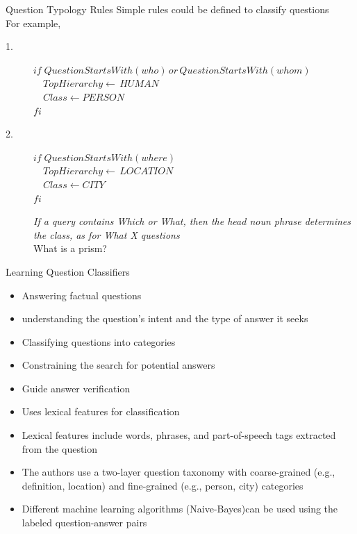 \begin{frame}{Question Typology Rules}
Simple rules could be defined to classify questions\\
For example, \\
\begin{description}
	\item[1.] $if \;QuestionStartsWith(who) \,or\, QuestionStartsWith(whom)$\\
	$\quad TopHierarchy \leftarrow \, \textit{HUMAN}$\\
	$\quad Class \leftarrow \textit{PERSON}$\\
	$fi$
	\item[2.]$if\; QuestionStartsWith(where)$\\
	$\quad TopHierarchy \leftarrow \, \textit{LOCATION}$\\
	$\quad Class \leftarrow \textit{CITY}$\\
	$fi$\\


	\item[]\textit{If  a  query  contains Which or What,  then the  head  noun phrase determines the class, as for What X questions}\\
	What is a prism?
\end{description}
\end{frame}
\begin{frame}{Learning Question Classifiers}
    \begin{minipage}{0.48\linewidth}
        \begin{itemize}
            \item Answering factual questions\cite{li-roth-2002-learning}
            \item understanding the question's intent and the type of answer it seeks
            \item Classifying questions into categories
            \item Constraining the search for potential answers
            \item Guide answer verification
        \end{itemize}
    \end{minipage}
    \begin{minipage}{0.48\linewidth}
    \begin{itemize}
        \item Uses lexical features for classification
        \item [] Lexical features include words, phrases, and part-of-speech tags extracted from the question
        \item The authors use a two-layer question taxonomy with coarse-grained (e.g., definition, location) and fine-grained (e.g., person, city) categories
        \item Different machine learning algorithms (Naive-Bayes)can be used using the  labeled question-answer pairs
    \end{itemize}
        \end{minipage}
\end{frame}

